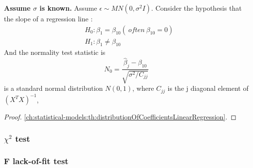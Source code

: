\begin{refsection}
\begin{lemma}\cite[261]{chinese2008probability}
	\textbf{Assume $\sigma$ is known.}	Assume $\epsilon \sim MN(0,\sigma^2 I)$. Consider the hypothesis that the slope of a regression line :
	\begin{align*}
	&H_0: \beta_1 = \beta_{10} (~often ~ \beta_{10} = 0)\\
	&H_1: \beta_1 \neq \beta_{10}
	\end{align*}
	And the normality test statistic is
	$$N_0 = \frac{\hat{\beta}_j - \beta_{10}}{\sqrt{\sigma^2/C_{jj}}}$$
is a standard normal distribution $N(0,1)$,	where $C_{jj}$ is the j diagonal element of $(X^TX)^{-1}$,
\end{lemma}
\begin{proof}
	\autoref{ch:statistical-models:th:distributionOfCoefficientsLinearRegression}.
\end{proof}

\subsubsection{$\chi^2$ test}



\subsubsection{F lack-of-fit test}



\end{refsection}
